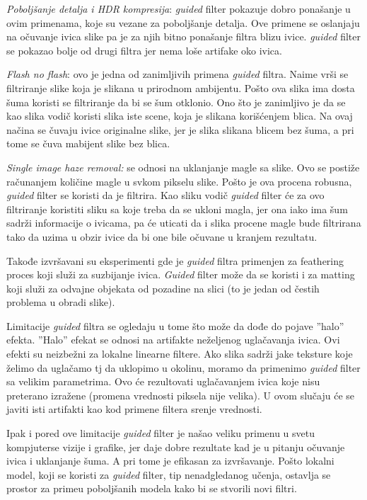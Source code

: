 \documentclass[a4paper,12pt,titlepage]{article}
\begin{document}
\emph{Poboljšanje detalja i HDR kompresija}: \emph{guided}  filter pokazuje dobro ponašanje u ovim primenama, koje su vezane za poboljšanje detalja. Ove primene se oslanjaju na očuvanje ivica slike pa je za njih bitno ponašanje filtra blizu ivice. \emph{guided} filter se pokazao bolje od drugi filtra jer nema loše artifake oko ivica. 

\emph{Flash no flash}: ovo je jedna od zanimljivih primena \emph{guided} filtra. Naime vrši se filtriranje slike koja je slikana u prirodnom ambijentu. Pošto ova slika ima dosta šuma koristi se filtriranje da bi se šum otklonio. Ono što je zanimljivo je da se kao slika vodič koristi slika iste scene, koja je slikana korišćenjem blica. Na ovaj načina se čuvaju ivice originalne slike, jer je slika slikana blicem bez šuma, a pri tome se čuva mabijent slike bez blica.

\emph{Single image haze removal:} se odnosi na uklanjanje magle sa slike. Ovo se postiže računanjem količine magle u svkom pikselu slike. Pošto je ova procena robusna, \emph{guided} filter se koristi da je filtrira. Kao sliku vodič \emph{guided} filter će za ovo filtriranje koristiti sliku sa koje treba da se ukloni magla, jer ona iako ima šum sadrži informacije o ivicama, pa će uticati da i slika procene magle bude filtrirana tako da uzima u obzir ivice da bi one bile očuvane u kranjem rezultatu.

Takođe izvršavani su eksperimenti gde je \emph{guided} filtra primenjen za feathering proces koji služi za suzbijanje ivica. \emph{Guided} filter može da se koristi i za matting koji služi za odvajne objekata od pozadine na slici (to je jedan od čestih problema u obradi slike).  

Limitacije \emph{guided} filtra se ogledaju u tome što može da dođe do pojave ''halo'' efekta. ''Halo'' efekat se odnosi na artifakte neželjenog uglačavanja ivica. Ovi efekti su neizbežni za lokalne linearne filtere. Ako slika sadrži jake teksture koje želimo da uglačamo tj da uklopimo u okolinu, moramo da primenimo \emph{guided} filter sa velikim parametrima. Ovo će rezultovati uglačavanjem ivica koje nisu preterano izražene (promena vrednosti piksela nije velika). U ovom slučaju će se javiti isti artifakti kao kod primene filtera srenje vrednosti.

Ipak i pored ove limitacije \emph{guided} filter je našao veliku primenu u svetu kompjuterse vizije i grafike, jer daje dobre rezultate kad je u pitanju očuvanje ivica i uklanjanje šuma. A pri tome je efikasan za izvršavanje. Pošto lokalni model, koji se koristi za \emph{guided} filter, tip nenadgledanog učenja, ostavlja se prostor za primeu poboljšanih modela kako bi se stvorili novi filtri.  
\end{document}
